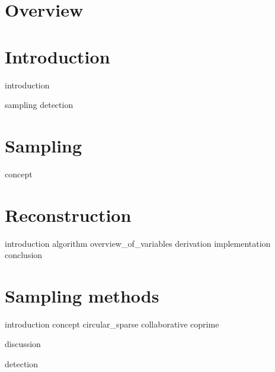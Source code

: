 \documentclass[a4paper, openany, oneside]{memoir}
\begin{document}
\chapter{Overview}

\chapter{Introduction}
{introduction}

{sampling}
{detection}


\chapter{Sampling}
\label{cha:sampling}

{concept}


\chapter{Reconstruction}
\label{cha:reconstruction}

{introduction}
{algorithm}
{overview_of_variables}
{derivation}
{implementation}
{conclusion}

\chapter{Sampling methods}
\label{cha:sampling_methods}

{introduction}
{concept}
{circular_sparse}
{collaborative}
{coprime}

{discussion}

{detection}
\end{document}
